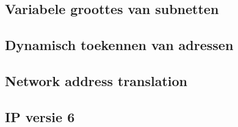 \subsection{Variabele groottes van subnetten}

\begin{frame}
\end{frame}

\subsection{Dynamisch toekennen van adressen}

\begin{frame}
\end{frame}

\subsection{Network address translation}

\begin{frame}
\end{frame}

\subsection{IP versie 6}

\begin{frame}
\end{frame}

